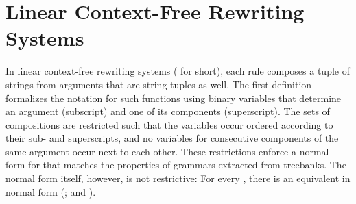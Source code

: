 \documentclass[../../document.tex]{subfiles}
\begin{document}
    \section{Linear Context-Free Rewriting Systems}\label{sec:grammar:lcfrs}
    In linear context-free rewriting systems ( for short), each rule composes a tuple of strings from arguments that are string tuples as well.
    The first definition formalizes the notation for such functions using binary variables that determine an argument (subscript) and one of its components (superscript).
    The sets of compositions are restricted such that the variables occur ordered according to their sub- and superscripts, and no variables for consecutive components of the same argument occur next to each other.
    These restrictions enforce a normal form for  that matches the properties of grammars extracted from treebanks.
    The normal form itself, however, is not restrictive: For every , there is an equivalent  in normal form (\citealp[Lemma~2.2]{SekMatFujKas91}; and \citealp[Definition~7.2]{Kal10}).
\end{document}
